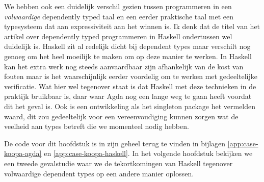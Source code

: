 We hebben ook een duidelijk verschil gezien tussen programmeren in een
\emph{volwaardige} dependently typed taal en een eerder praktische taal met een
typesysteem dat aan expressiviteit aan het winnen is. Ik denk dat de titel van
het artikel over dependently typed programmeren in Haskell ondertussen wel
duidelijk is. Haskell zit al redelijk dicht bij dependent types maar verschilt
nog genoeg om het heel moeilijk te maken om op deze manier te werken. In
Haskell kan het extra werk nog steeds aanvaardbaar zijn afhankelijk van de kost
van fouten maar is het waarschijnlijk eerder voordelig om te werken met
gedeeltelijke verificatie. Wat hier wel tegenover staat is dat Haskell met deze
technieken in de praktijk bruikbaar is, daar waar Agda nog een lange weg te
gaan heeft voordat dit het geval is. Ook is een ontwikkeling als het singleton
package \cite{singletonpack} het vermelden waard, dit zou gedeeltelijk voor een
vereenvoudiging kunnen zorgen wat de veelheid aan types betreft die we
momenteel nodig hebben.

De code voor dit hoofdstuk is in zijn geheel terug te vinden in bijlagen
\ref{app:case-koopa-agda} en \ref{app:case-koopa-haskell}. In het volgende
hoofdstuk bekijken we een tweede gevalstudie waar we de tekortkomingen van
Haskell tegenover volwaardige dependent types op een andere manier oplossen.


